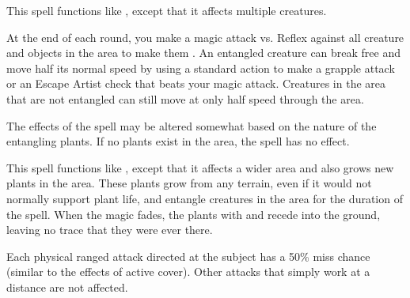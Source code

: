 \begin{spelleffect}
    This spell functions like , except that it affects multiple creatures.
\end{spelleffect}

\spelldur{\durshort \dismissable}
\begin{spelleffect}
    At the end of each round, you make a magic attack vs. Reflex against all creature and objects in the area to make them \entangled. An entangled creature can break free and move half its normal speed by using a standard action to make a grapple attack or an Escape Artist check that beats your magic attack. Creatures in the area that are not entangled can still move at only half speed through the area.
\end{spelleffect}
\begin{spellnotes}
    The effects of the spell may be altered somewhat based on the nature of the entangling plants. If no plants exist in the area, the spell has no effect.
\end{spellnotes}

\begin{spelleffect}
    This spell functions like , except that it affects a wider area and also grows new plants in the area. These plants grow from any terrain, even if it would not normally support plant life, and entangle creatures in the area for the duration of the spell. When the magic fades, the plants with and recede into the ground, leaving no trace that they were ever there.
\end{spelleffect}

\spelldur{\durshort \dismissable}
\begin{spelleffect}
    Each physical ranged attack directed at the subject has a 50\% miss chance (similar to the effects of active cover). Other attacks that simply work at a distance are not affected.
\end{spelleffect}

